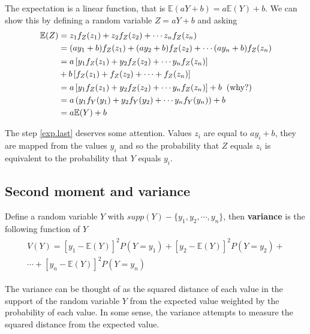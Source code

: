 The expectation is a linear function, that is $\mathbb{E}(aY + b) = a\mathbb{E}(Y) + b $. 
We can show this by defining a random variable $Z = aY+b$ and asking 
\begin{align}
    \mathbb{E}(Z) &= z_{1} f_{Z}(z_{1}) + z_{2} f_{Z}(z_{2}) + \cdots z_{n} f_{Z}(z_{n})\\
                  &=  (ay_{1}+b) f_{Z}(z_{1}) + (ay_{2}+b) f_{Z}(z_{2})+ \cdots (ay_{n}+b) f_{Z}(z_{n})\\
                  & \begin{aligned}
                  &= a \left[ y_{1}f_{Z}(z_{1}) + y_{2}f_{Z}(z_{2}) + \cdots y_{n}f_{Z}(z_{n}) \right] \\
                  &+ b\left[f_{Z}(z_{1}) + f_{Z}(z_{2}) + \cdots + f_{Z}(z_{n}) \right]
                  \end{aligned} \\
                  &= a \left[ y_{1}f_{Z}(z_{1}) + y_{2}f_{Z}(z_{2}) + \cdots y_{n}f_{Z}(z_{n}) \right] + b \hspace{2mm} \text{(why?)} \\
                  &= a \left( y_{1}f_{Y}(y_{1}) + y_{2}f_{Y}(y_{2}) + \cdots y_{n}f_{Y}(y_{n}) \right) + b \label{exp.last} \\
                  &= a \mathbb{E}(Y) + b 
\end{align}

The step \eqref{exp.last} deserves some attention. Values $z_{i}$ are equal to $ay_{i} + b$, they are mapped from the values $y_{i}$ and so the probability that $Z$ equals $z_{i}$ is equivalent to the probability that $Y$ equals $y_{i}$.  

\subsection{Second moment and variance}

Define a random variable $Y$ with $supp(Y) - \{y_{1},y_{2},\cdots,y_{n}\}$, then \textbf{variance} is the following function of $Y$
\begin{align}
    \begin{aligned}
        V(Y) = \left[y_{1} - \mathbb{E}(Y) \right]^{2} P(Y=y_{1}) + \left[y_{2} - \mathbb{E}(Y) \right]^{2} P(Y=y_{2}) +\\ \cdots + \left[y_{n} - \mathbb{E}(Y) \right]^{2} P(Y=y_{n})
    \end{aligned}
\end{align}

The variance can be thought of as the squared distance of each value in the support of the random variable $Y$ from the expected value weighted by the probability of each value. 
In some sense, the variance attempts to measure the squared distance from the expected value.

